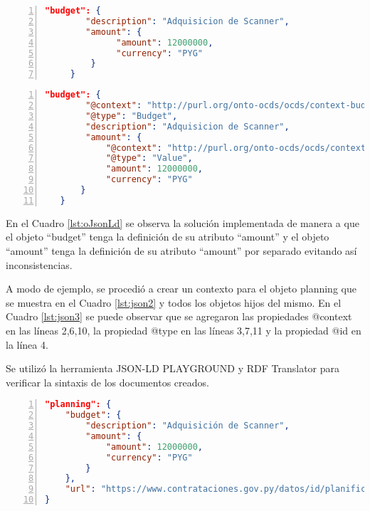 \noindent\begin{minipage}{\textwidth}
\begin{lstlisting}[captionpos=b, caption=Objeto JSON con colisión semántica entre conceptos, label=lst:oJson,language=json,firstnumber=1,  numbers=left,  numberstyle=\tiny\color{mygray},frame=single]
    "budget": {
        "description": "Adquisicion de Scanner",
        "amount": {
              "amount": 12000000,
              "currency": "PYG"
         }
     }  
    \end{lstlisting}
\end{minipage}
\noindent
\begin{minipage}{\textwidth}
    \begin{lstlisting}[captionpos=b, caption=Objeto JSON-LD. Sin colisión semántica entre conceptos , label=lst:oJsonLd, language=json,firstnumber=1,  numbers=left,  numberstyle=\tiny\color{mygray},frame=single]
    "budget": {
        "@context": "http://purl.org/onto-ocds/ocds/context-budget.json",
        "@type": "Budget",
        "description": "Adquisicion de Scanner",
        "amount": {
            "@context": "http://purl.org/onto-ocds/ocds/context-value.json",
            "@type": "Value",
            "amount": 12000000,
            "currency": "PYG"
       }
   }   
        \end{lstlisting}
    \end{minipage}

        En el Cuadro \ref{lst:oJsonLd} se observa la solución implementada de manera a que el objeto “budget” tenga la definición de su atributo “amount” y el objeto “amount” tenga la definición de su atributo “amount” por separado evitando así inconsistencias.

A modo de ejemplo, se procedió a crear un contexto para el objeto planning que se muestra en el Cuadro \ref{lst:json2} y todos los objetos hijos del mismo. En el Cuadro \ref{lst:json3} se puede observar que se agregaron las propiedades @context en las líneas 2,6,10, la propiedad @type en las líneas 3,7,11 y la propiedad @id en la línea 4.

Se utilizó la herramienta JSON-LD PLAYGROUND \cite{JSONLDPl78:online} y RDF Translator \cite{RDFTrans0:online} para verificar la sintaxis de los documentos creados.\hfill \break

\noindent\begin{minipage}{\textwidth}
\begin{lstlisting}[captionpos=b, caption=Objeto JSON del OCDS de un Planning, label=lst:json2,  numbers=left, language=json, firstnumber=1, numberstyle=\tiny\color{mygray},frame=single]
"planning": {
    "budget": { 
        "description": "Adquisición de Scanner",
        "amount": {
            "amount": 12000000,
            "currency": "PYG"
        }
    },
    "url": "https://www.contrataciones.gov.py/datos/id/planificaciones/193399-adquisicion-scanner"
}
\end{lstlisting}
\end{minipage}

